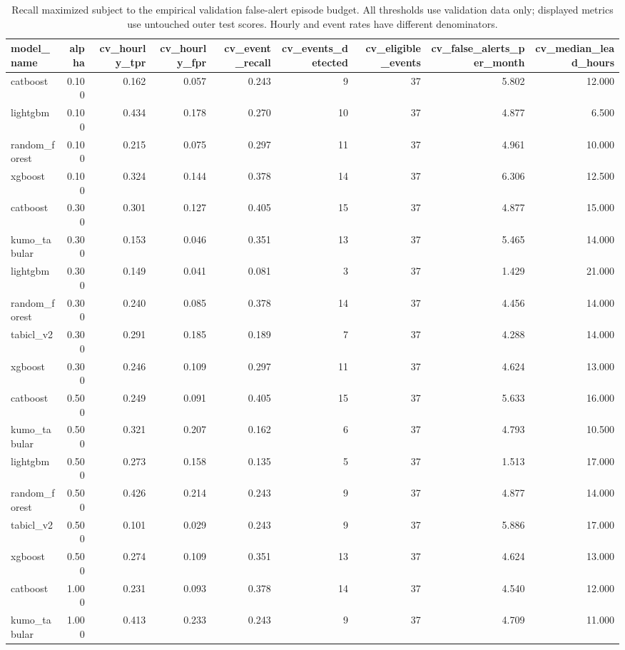 \begin{table}
\caption{Recall maximized subject to the empirical validation false-alert episode budget. All thresholds use validation data only; displayed metrics use untouched outer test scores. Hourly and event rates have different denominators.}
\begin{tabular}{lrrrrrrrr}
\toprule
model\_name & alpha & cv\_hourly\_tpr & cv\_hourly\_fpr & cv\_event\_recall & cv\_events\_detected & cv\_eligible\_events & cv\_false\_alerts\_per\_month & cv\_median\_lead\_hours \\
\midrule
catboost & 0.100 & 0.162 & 0.057 & 0.243 & 9 & 37 & 5.802 & 12.000 \\
lightgbm & 0.100 & 0.434 & 0.178 & 0.270 & 10 & 37 & 4.877 & 6.500 \\
random\_forest & 0.100 & 0.215 & 0.075 & 0.297 & 11 & 37 & 4.961 & 10.000 \\
xgboost & 0.100 & 0.324 & 0.144 & 0.378 & 14 & 37 & 6.306 & 12.500 \\
catboost & 0.300 & 0.301 & 0.127 & 0.405 & 15 & 37 & 4.877 & 15.000 \\
kumo\_tabular & 0.300 & 0.153 & 0.046 & 0.351 & 13 & 37 & 5.465 & 14.000 \\
lightgbm & 0.300 & 0.149 & 0.041 & 0.081 & 3 & 37 & 1.429 & 21.000 \\
random\_forest & 0.300 & 0.240 & 0.085 & 0.378 & 14 & 37 & 4.456 & 14.000 \\
tabicl\_v2 & 0.300 & 0.291 & 0.185 & 0.189 & 7 & 37 & 4.288 & 14.000 \\
xgboost & 0.300 & 0.246 & 0.109 & 0.297 & 11 & 37 & 4.624 & 13.000 \\
catboost & 0.500 & 0.249 & 0.091 & 0.405 & 15 & 37 & 5.633 & 16.000 \\
kumo\_tabular & 0.500 & 0.321 & 0.207 & 0.162 & 6 & 37 & 4.793 & 10.500 \\
lightgbm & 0.500 & 0.273 & 0.158 & 0.135 & 5 & 37 & 1.513 & 17.000 \\
random\_forest & 0.500 & 0.426 & 0.214 & 0.243 & 9 & 37 & 4.877 & 14.000 \\
tabicl\_v2 & 0.500 & 0.101 & 0.029 & 0.243 & 9 & 37 & 5.886 & 17.000 \\
xgboost & 0.500 & 0.274 & 0.109 & 0.351 & 13 & 37 & 4.624 & 13.000 \\
catboost & 1.000 & 0.231 & 0.093 & 0.378 & 14 & 37 & 4.540 & 12.000 \\
kumo\_tabular & 1.000 & 0.413 & 0.233 & 0.243 & 9 & 37 & 4.709 & 11.000 \\

\end{tabular}
\end{table}
